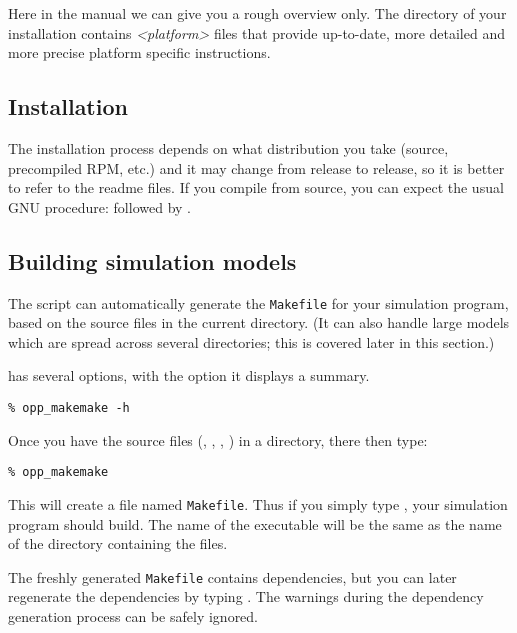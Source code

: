 Here in the manual we can give you a rough overview only.
The  directory of your {\opp} installation contains
\textit{<platform>} files that provide
up-to-date, more detailed and more precise platform specific
instructions.


\subsection{Installation}

The installation process depends on what distribution you take
(source, precompiled RPM, etc.) and it may change from release
to release, so it is better to refer to the readme files.
If you compile from source, you can expect the usual GNU
procedure:  followed by .


\subsection{Building simulation models}

The  script can automatically generate the
\texttt{Makefile} for your simulation program, based on the source files
in the current directory. (It can also handle large models
which are spread across several directories; this is covered later in
this section.)

 has several options, with the 
option it displays a summary.

\begin{verbatim}
% opp_makemake -h
\end{verbatim}

Once you have the source files (, , ,
) in a directory,  there then type:

\begin{verbatim}
% opp_makemake
\end{verbatim}

This will create a file named \texttt{Makefile}. Thus if you
simply type , your simulation program should build. The name of
the executable will be the same as the name of the directory
containing the files.


The freshly generated \texttt{Makefile} contains
dependencies, but you can later
regenerate the dependencies by typing .
The warnings during the dependency generation process can
be safely ignored.

